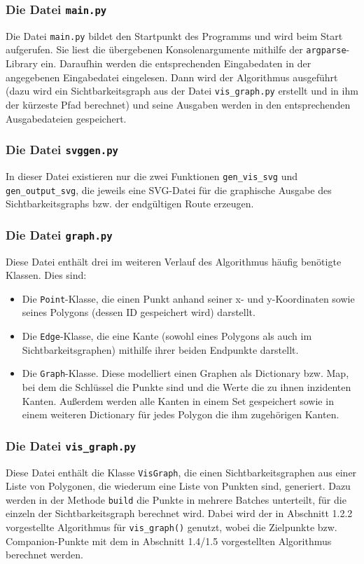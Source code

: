 \documentclass[a4paper, notitlepage, 12pt]{scrartcl}
\begin{document}
\subsubsection{Die Datei \texttt{main.py}}
Die Datei \texttt{main.py} bildet den Startpunkt des Programms und wird beim Start aufgerufen. Sie liest die übergebenen Konsolenargumente mithilfe der \texttt{argparse}-Library ein. Daraufhin werden die entsprechenden Eingabedaten in der angegebenen Eingabedatei eingelesen. Dann wird der Algorithmus ausgeführt (dazu wird ein Sichtbarkeitsgraph aus der Datei \texttt{vis\_graph.py} erstellt und in ihm der kürzeste Pfad berechnet) und seine Ausgaben werden in den entsprechenden Ausgabedateien gespeichert.
\subsubsection{Die Datei \texttt{svggen.py}}
In dieser Datei existieren nur die zwei Funktionen \texttt{gen\_vis\_svg} und \texttt{gen\_output\_svg}, die jeweils eine SVG-Datei für die graphische Ausgabe des Sichtbarkeitsgraphs bzw. der endgültigen Route erzeugen.
\subsubsection{Die Datei \texttt{graph.py}}
Diese Datei enthält drei im weiteren Verlauf des Algorithmus häufig benötigte Klassen. Dies sind:
\begin{itemize}
	\item Die \texttt{Point}-Klasse, die einen Punkt anhand seiner x- und y-Koordinaten sowie seines Polygons (dessen ID gespeichert wird) darstellt.
	\item Die \texttt{Edge}-Klasse, die eine Kante (sowohl eines Polygons als auch im Sichtbarkeitsgraphen) mithilfe ihrer beiden Endpunkte darstellt.
	\item Die \texttt{Graph}-Klasse. Diese modelliert einen Graphen als Dictionary bzw. Map, bei dem die Schlüssel die Punkte sind und die Werte die zu ihnen inzidenten Kanten. Außerdem werden alle Kanten in einem Set gespeichert sowie in einem weiteren Dictionary für jedes Polygon die ihm zugehörigen Kanten.
\end{itemize}
\subsubsection{Die Datei \texttt{vis\_graph.py}}
Diese Datei enthält die Klasse \texttt{VisGraph}, die einen Sichtbarkeitsgraphen aus einer Liste von Polygonen, die wiederum eine Liste von Punkten sind, generiert. Dazu werden in der Methode \texttt{build} die Punkte in mehrere Batches unterteilt, für die einzeln der Sichtbarkeitsgraph berechnet wird. Dabei wird der in Abschnitt 1.2.2 vorgestellte Algorithmus für \texttt{vis\_graph()} genutzt, wobei die Zielpunkte bzw. Companion-Punkte mit dem in Abschnitt 1.4/1.5 vorgestellten Algorithmus berechnet werden.
\end{document}
